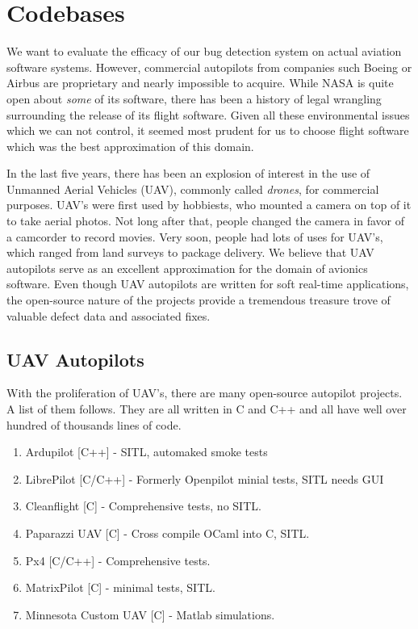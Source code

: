 \section{Codebases} \label{autopilot}

We want to evaluate the efficacy of our bug detection system on
actual aviation software systems. However, commercial autopilots
from companies such Boeing or Airbus are proprietary and nearly
impossible to acquire. While NASA is quite open about \textit{some} of its
software, there has been a history of legal wrangling surrounding the
release of its flight software. Given all these environmental issues which
we can not control, it seemed most prudent for us to choose flight
software which was the best approximation of this domain. 

In the last five years, there has been an explosion of interest in the
use of Unmanned Aerial Vehicles (UAV), commonly called
\textit{drones}, for commercial purposes. UAV's were first used by
hobbiests, who mounted a camera on top of it to take aerial
photos. Not long after that, people changed the camera in favor of a
camcorder to record movies. Very soon, people had lots of uses for
UAV's, which ranged from land surveys to package delivery. We believe
that UAV autopilots serve as an excellent approximation for the domain
of avionics software. Even though UAV autopilots are written for soft
real-time applications, the open-source nature of the projects provide
a tremendous treasure trove of valuable defect data and associated fixes.

\subsection{UAV Autopilots} \label{uav_autopilots}
With the proliferation of UAV's, there are many open-source autopilot
projects. A list of them follows. They are all written in C and C++ and
all have well over hundred of thousands lines of code.

\begin{enumerate}
\item Ardupilot [C++] - SITL, automaked smoke tests
\item LibrePilot [C/C++] - Formerly Openpilot minial tests, SITL needs
  GUI
\item Cleanflight [C] - Comprehensive tests, no SITL.
\item Paparazzi UAV [C] - Cross compile OCaml into C, SITL.
\item Px4 [C/C++] - Comprehensive tests.
\item MatrixPilot [C] - minimal tests, SITL.
\item Minnesota Custom UAV [C] - Matlab simulations.
\end{enumerate}

